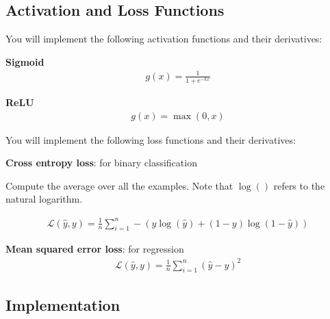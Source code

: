 \documentclass[12pt]{article}
\begin{document}
\subsection{Activation and Loss Functions}

You will implement the following activation functions and their derivatives:

\textbf{Sigmoid}
\begin{align*}
    g(x) = \frac{1}{1 + e^{-kx}}
\end{align*}


\textbf{ReLU}
\begin{align*}
    g(x) = \max(0, x)
\end{align*}


You will implement the following loss functions and their derivatives:

\textbf{Cross entropy loss}: for binary classification

Compute the average over all the examples. Note that $\log()$ refers to the natural logarithm.

\begin{align*}
    \mathcal{L}(\hat{y}, y) = \frac{1}{n} \sum_{i=1}^n -(y \log(\hat{y}) + (1 - y)\log(1-\hat{y}))
\end{align*}

\textbf{Mean squared error loss}: for regression
\begin{align*}
    \mathcal{L}(\hat{y}, y) = \frac{1}{n} \sum_{i=1}^n (\hat{y} - y)^2
\end{align*}

\subsection{Implementation}
\end{document}
